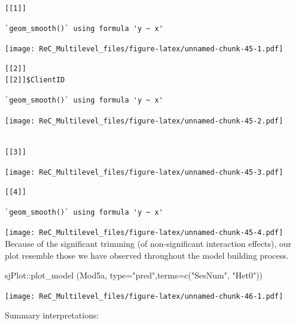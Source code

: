\documentclass[
  11pt,
]{book}
\newenvironment{Shaded}{\begin{snugshade}}{\end{snugshade}}
\newcommand{\AttributeTok}[1]{\textcolor[rgb]{0.77,0.63,0.00}{#1}}
\newcommand{\FunctionTok}[1]{\textcolor[rgb]{0.00,0.00,0.00}{#1}}
\newcommand{\NormalTok}[1]{#1}
\newcommand{\SpecialCharTok}[1]{\textcolor[rgb]{0.00,0.00,0.00}{#1}}
\newcommand{\StringTok}[1]{\textcolor[rgb]{0.31,0.60,0.02}{#1}}
\begin{document}
\begin{verbatim}
[[1]]
\end{verbatim}

\begin{verbatim}
`geom_smooth()` using formula 'y ~ x'
\end{verbatim}

\texttt{[image: ReC\_Multilevel\_files/figure-latex/unnamed-chunk-45-1.pdf]}

\begin{verbatim}
[[2]]
[[2]]$ClientID
\end{verbatim}

\begin{verbatim}
`geom_smooth()` using formula 'y ~ x'
\end{verbatim}

\texttt{[image: ReC\_Multilevel\_files/figure-latex/unnamed-chunk-45-2.pdf]}

\begin{verbatim}

[[3]]
\end{verbatim}

\texttt{[image: ReC\_Multilevel\_files/figure-latex/unnamed-chunk-45-3.pdf]}

\begin{verbatim}
[[4]]
\end{verbatim}

\begin{verbatim}
`geom_smooth()` using formula 'y ~ x'
\end{verbatim}

\texttt{[image: ReC\_Multilevel\_files/figure-latex/unnamed-chunk-45-4.pdf]}
Because of the significant trimming (of non-significant interaction effects), our plot resemble those we have observed throughout the model building process.

\begin{Shaded}
\begin{Highlighting}[]
\NormalTok{sjPlot}\SpecialCharTok{::}\FunctionTok{plot\_model}\NormalTok{ (Mod5a, }\AttributeTok{type=}\StringTok{"pred"}\NormalTok{,}\AttributeTok{terms=}\FunctionTok{c}\NormalTok{(}\StringTok{"SesNum"}\NormalTok{, }\StringTok{"Het0"}\NormalTok{))}
\end{Highlighting}
\end{Shaded}

\texttt{[image: ReC\_Multilevel\_files/figure-latex/unnamed-chunk-46-1.pdf]}

Summary interpretations:
\end{document}
